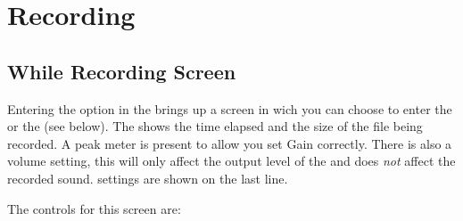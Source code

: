 \section{\label{ref:Recording}Recording}
\subsection{\label{ref:Whilerecordingscreen}While Recording Screen}

Entering the  option in the  brings up
a screen in wich you can choose to enter the  or
the  (see below). The 
shows the time elapsed and the size of the file being recorded. A peak meter
is present to allow you set Gain correctly. There is also a volume setting,
this will only affect the output level of the \dap{} and does \emph{not}
affect the recorded sound.
 settings are shown on the last line.

The controls for this screen are:


